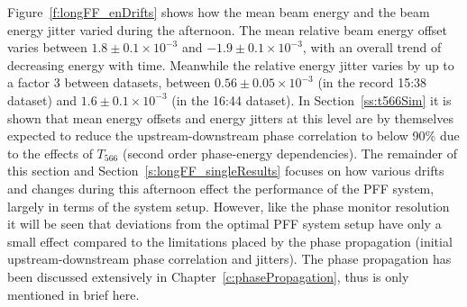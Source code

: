 Figure~\ref{f:longFF_enDrifts} shows how the mean beam energy and the beam energy jitter varied during the afternoon. The mean relative beam energy offset varies between \(1.8\pm0.1\times10^{-3}\) and \(-1.9\pm0.1\times10^{-3}\), with an overall trend of decreasing energy with time. Meanwhile the relative energy jitter varies by up to a factor 3 between datasets, between \(0.56\pm0.05\times10^{-3}\) (in the record 15:38 dataset) and \(1.6\pm0.1\times10^{-3}\) (in the 16:44 dataset). In Section~\ref{ss:t566Sim} it is shown that mean energy offsets and energy jitters at this level are by themselves expected to reduce the upstream-downstream phase correlation to below 90\% due to the effects of \(T_{566}\) (second order phase-energy dependencies). The remainder of this section and Section~\ref{s:longFF_singleResults} focuses on how various drifts and changes during this afternoon effect the performance of the PFF system, largely in terms of the system setup. However, like the phase monitor resolution it will be seen that deviations from the optimal PFF system setup have only a small effect compared to the limitations placed by the phase propagation (initial upstream-downstream phase correlation and jitters). The phase propagation has been discussed extensively in Chapter~\ref{c:phasePropagation}, thus is only mentioned in brief here.

